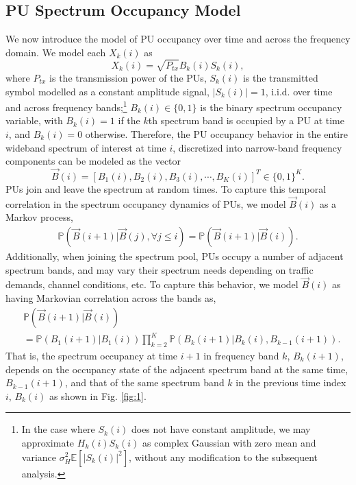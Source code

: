 \documentclass[10pt,twocolumn]{IEEEtran}
\begin{document}
\subsection{PU Spectrum Occupancy Model}
We now introduce the model of PU occupancy over time and across the frequency domain. We model each $X_k(i)$ as 
\begin{equation}\label{4}
    X_k(i) = \sqrt{P_{tx}}B_k(i)S_k(i),
\end{equation}
where $P_{tx}$ is the transmission power of the PUs, $S_k(i)$ is the transmitted symbol modelled as a constant amplitude signal, $|S_k(i)|{=}1$, i.i.d. over time and across frequency bands;\footnote{In the case where $S_k(i)$ does not have constant amplitude, we may approximate $H_{k}(i)S_{k}(i)$ as complex Gaussian with zero mean and variance $\sigma_H^2\mathbb E[|S_{k}(i)|^2]$, without any modification to the subsequent analysis.} $B_k(i){\in}\{0,1\}$ is the binary spectrum occupancy variable, with $B_k(i){=}1$ if the $k$th spectrum band is occupied by a PU at time $i$, and $B_k(i){=}0$ otherwise. Therefore, the PU occupancy behavior in the entire wideband spectrum of interest at time $i$, discretized into narrow-band frequency components can be modeled as the vector 
\begin{equation}\label{5}
    \vec{B}(i) = [B_1(i), B_2(i), B_3(i), \cdots, B_K(i)]^T {\in} \{0, 1\}^K.
\end{equation}
PUs join and leave the spectrum at random times. To capture this temporal correlation in the spectrum occupancy dynamics of PUs, we model $\vec{B}(i)$ as a Markov process,
\begin{equation}\label{6}
    \begin{aligned}
        \mathbb{P}(\vec{B}(i+1)|\vec{B}(j), \forall j \leq i) = \mathbb{P}(\vec{B}(i+1)|\vec{B}(i)).
    \end{aligned}
\end{equation}
Additionally, when joining the spectrum pool, PUs occupy a number of adjacent spectrum bands, and may vary their spectrum needs depending on traffic demands, channel conditions, etc. To capture this behavior, we model $\vec{B}(i)$ as having Markovian correlation across the bands as, 
\begin{align}\label{7}
&         \mathbb{P}(\vec{B}(i+1)|\vec{B}(i))\\&=
\nonumber
         \mathbb{P}(B_{1}(i+1)|B_{1}(i))
         \prod_{k=2}^{K} \mathbb{P}(B_{k}(i+1)|B_{k}(i), B_{k-1}(i+1)).
\end{align}
That is, the spectrum occupancy at time $i+1$ in frequency band $k$, $B_{k}(i+1)$, depends on the  occupancy state of the adjacent spectrum band at the same time, $B_{k-1}(i+1)$, and that of the same spectrum band $k$ in the previous time index $i$, $B_{k}(i)$ as shown in Fig. \ref{fig:1}.
\end{document}
